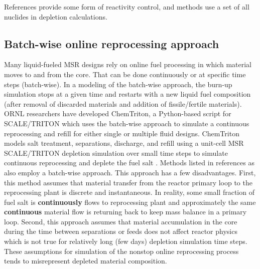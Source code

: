 References \cite{li_optimization_2018,de_troullioud_de_lanversin_toward_2017,doligez_coupled_2014,
heuer_towards_2014, sheu_depletion_2013, aufiero_extended_2013} provide some form of reactivity control, 
and methods \cite{doligez_coupled_2014,heuer_towards_2014,aufiero_extended_2013,ahmad_neutronics_2015, 
park_whole_2015,jeong_equilibrium_2016,rykhlevskii_modeling_2019,nuttin_potential_2005} use a set of all nuclides in depletion calculations. 

\subsection{Batch-wise online reprocessing approach}
Many liquid-fueled \gls{MSR} designs rely on online fuel processing in which  
material moves to and from the core. That can be done continuously or at 
specific time steps (batch-wise). In a modeling of the batch-wise approach, 
the burn-up simulation stops at a given 
time and restarts with a new liquid fuel composition (after removal of discarded 
materials and addition of fissile/fertile materials). \gls{ORNL} researchers 
have developed ChemTriton, a Python-based script for SCALE/TRITON which uses the 
batch-wise approach to simulate a continuous reprocessing and refill for 
either single or multiple fluid designs. ChemTriton models salt 
treatment, separations, discharge, and refill using a unit-cell \gls{MSR} 
SCALE/TRITON depletion simulation over small time steps to simulate continuous 
reprocessing and deplete the fuel salt \cite{powers_new_2013}. Methods listed in 
references \cite{zhou_fuel_2018-1, sheu_depletion_2013,
park_whole_2015, jeong_equilibrium_2016, powers_inventory_2014,
betzler_molten_2017,rykhlevskii_modeling_2019} 
as also employ a batch-wise approach. This approach has a few disadvantages. 
First, this method assumes that material transfer from the reactor primary 
loop to the reprocessing plant is discrete and instantaneous. In reality, 
some small fraction of fuel salt is \textbf{continuously} flows to 
reprocessing plant and approximately the same \textbf{continuous} material flow 
is returning back to keep mass balance in a primary loop. Second, this approach 
assumes that material accumulation in the core 
during the time between separations or feeds does not affect reactor physics which 
is not true for relatively long (few days) depletion simulation time steps. 
These assumptions for simulation of the nonstop online reprocessing process 
tends to misrepresent depleted material composition.

